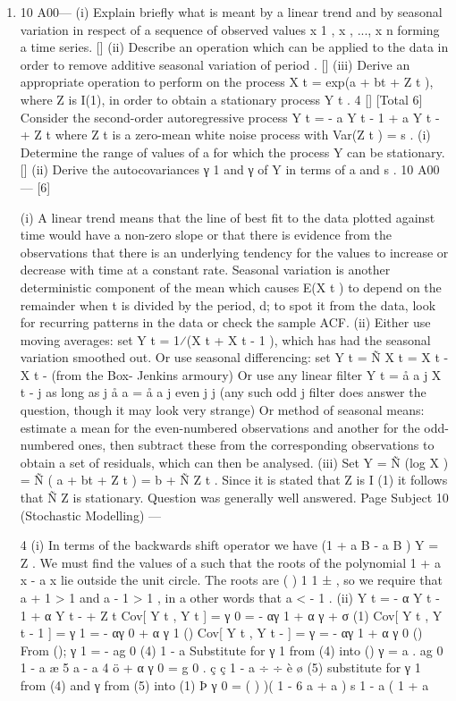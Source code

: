 \documentclass[a4paper,1pt]{article}
\begin{document}
\begin{enumerate}
\item
10 A00—
(i) Explain briefly what is meant by a linear trend and by seasonal variation in
respect of a sequence of observed values {x 1 , x  , ..., x n } forming a time series.
[]
(ii) Describe an operation which can be applied to the data in order to remove
additive seasonal variation of period .
[]
(iii) Derive an appropriate operation to perform on the process
X t = exp(a + bt + Z t ),
where Z is I(1), in order to obtain a stationary process Y t .
4
[]
[Total 6]
Consider the second-order autoregressive process
Y t = -  a Y t - 1 + a  Y t -  + Z t
where {Z t } is a zero-mean white noise process with Var(Z t ) = s  .
(i) Determine the range of values of a for which the process Y can be stationary.
[]
(ii) Derive the autocovariances γ 1 and γ  of Y in terms of a and s .
10 A00—
[6]


(i)
A linear trend means that the line of best fit to the data plotted against time
would have a non-zero slope or that there is evidence from the observations
that there is an underlying tendency for the values to increase or decrease with
time at a constant rate.
Seasonal variation is another deterministic component of the mean which
causes E(X t ) to depend on the remainder when t is divided by the period, d; to
spot it from the data, look for recurring patterns in the data or check the
sample ACF.
(ii)
Either use moving averages: set Y t = 1⁄(X t + X t - 1 ), which has had the seasonal
variation smoothed out.
Or use seasonal differencing: set Y t = Ñ  X t = X t - X t -  (from the Box-
Jenkins armoury)
Or use any linear filter Y t = å a j X t - j as long as
j
å a = å a
j
even j
j
(any such
odd j
filter does answer the question, though it may look very strange)
Or method of seasonal means: estimate a mean for the even-numbered
observations and another for the odd-numbered ones, then subtract these from
the corresponding observations to obtain a set of residuals, which can then be
analysed.
(iii)
Set Y = Ñ (log X ) = Ñ ( a + bt + Z t ) = b + Ñ Z t .
Since it is stated that Z is I (1) it follows that Ñ Z is stationary.
Question  was generally well answered.
Page Subject 10 (Stochastic Modelling) — 

4
(i)
In terms of the backwards shift operator we have
(1 +  a B - a  B  ) Y = Z .
We must find the values of a such that the roots of the polynomial
1 +  a x - a  x  lie outside the unit circle.
The roots are
(
)
1
1 ±  , so we require that
a
 + 1
> 1 and
a
 - 1
> 1 , in
a
other words that a <  - 1 .
(ii)
Y t = - α Y t - 1 + α  Y t -  + Z t
Cov[ Y t , Y t ] = γ 0 = - αγ 1 + α  γ  + σ  (1)
Cov[ Y t , Y t - 1 ] = γ 1 = - αγ 0 + α  γ 1 ()
Cov[ Y t , Y t -  ] = γ  = - αγ 1 + α  γ 0 ()
From (); γ 1 = -
 ag 0
(4)
1 - a 
Substitute for γ 1 from (4) into ()
γ  =  a .
 ag 0
1 - a 
æ 5 a  - a 4 ö
+ α  γ 0 = g 0 . ç
ç 1 - a  ÷ ÷
è
ø
(5)
substitute for γ 1 from (4) and γ  from (5) into (1)
Þ
γ 0 =
( )
)( 1 - 6 a + a )
s  1 - a 
(
1 + a 


\end{enumerate}
\end{document}

